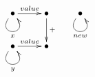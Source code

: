 $\xymatrix{
   \bullet \ar@(dl,dr)[]_{x} \ar[r]^{value} & \bullet \ar[d]^{+} & 
   \bullet \ar@(dl,dr)[]_{new} \\
   \bullet \ar@(dl,dr)[]_{y} \ar[r]^{value} & \bullet
}$

